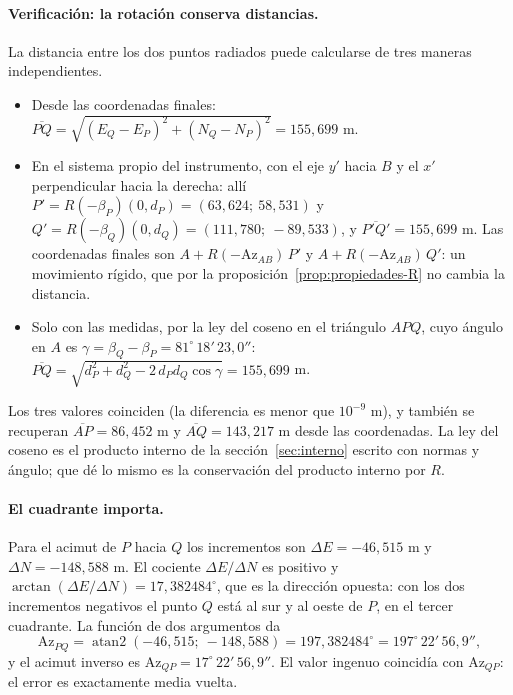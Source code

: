\paragraph{Verificación: la rotación conserva distancias.} La distancia entre los dos puntos
radiados puede calcularse de tres maneras independientes.
\begin{itemize}
  \item Desde las coordenadas finales: \(\overline{PQ}=\sqrt{(E_Q-E_P)^2+(N_Q-N_P)^2}=155{,}699\) m.
  \item En el sistema propio del instrumento, con el eje \(y'\) hacia \(B\) y el \(x'\)
  perpendicular hacia la derecha: allí \(P'=R(-\beta_P)(0,d_P)=(63{,}624;\ 58{,}531)\) y
  \(Q'=R(-\beta_Q)(0,d_Q)=(111{,}780;\ -89{,}533)\), y \(\overline{P'Q'}=155{,}699\) m. Las
  coordenadas finales son \(A+R(-\mathrm{Az}_{AB})\,P'\) y \(A+R(-\mathrm{Az}_{AB})\,Q'\): un
  movimiento rígido, que por la proposición~\ref{prop:propiedades-R} no cambia la distancia.
  \item Solo con las medidas, por la ley del coseno en el triángulo \(APQ\), cuyo ángulo en
  \(A\) es \(\gamma=\beta_Q-\beta_P=81^\circ\,18'\,23{,}0''\):
  \(\overline{PQ}=\sqrt{d_P^2+d_Q^2-2\,d_Pd_Q\cos\gamma}=155{,}699\) m.
\end{itemize}
Los tres valores coinciden (la diferencia es menor que \(10^{-9}\) m), y también se recuperan
\(\overline{AP}=86{,}452\) m y \(\overline{AQ}=143{,}217\) m desde las coordenadas. La ley del
coseno es el producto interno de la sección~\ref{sec:interno} escrito con normas y ángulo; que
dé lo mismo es la conservación del producto interno por \(R\).

\paragraph{El cuadrante importa.} Para el acimut de \(P\) hacia \(Q\) los incrementos son
\(\Delta E=-46{,}515\) m y \(\Delta N=-148{,}588\) m. El cociente \(\Delta E/\Delta N\) es
positivo y \(\arctan(\Delta E/\Delta N)=17{,}382484^\circ\), que es la dirección opuesta: con
los dos incrementos negativos el punto \(Q\) está al sur y al oeste de \(P\), en el tercer
cuadrante. La función de dos argumentos da
\[
\mathrm{Az}_{PQ}=\operatorname{atan2}(-46{,}515;\ -148{,}588)=197{,}382484^\circ=197^\circ\,22'\,56{,}9'',
\]
y el acimut inverso es \(\mathrm{Az}_{QP}=17^\circ\,22'\,56{,}9''\). El valor ingenuo coincidía
con \(\mathrm{Az}_{QP}\): el error es exactamente media vuelta.


